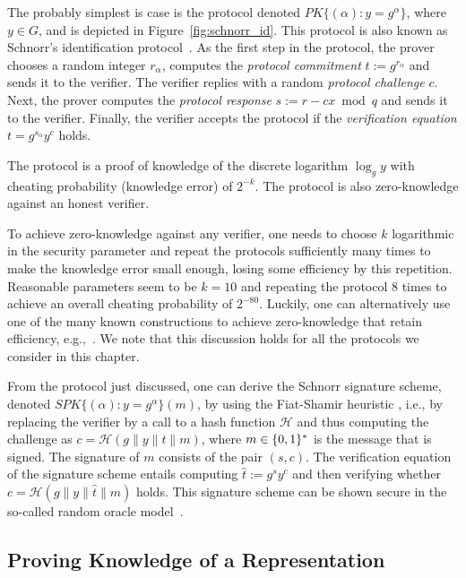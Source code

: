 The probably simplest is case is the protocol  
denoted $\textit{PK}\{(\alpha): y = g^\alpha \}$, where $y \in G$, and is depicted in Figure~\ref{fig:schnorr_id}.
This protocol is also known as Schnorr's identification protocol~\cite{schnor91}.
As the first step in the protocol,
the prover chooses a random integer $r_\alpha$, 
computes the \emph{protocol commitment}
$t:= g^{r_\alpha}$ and sends it to the verifier.
The verifier replies with a random \emph{protocol challenge}
 $c$. 
Next, the prover computes the \emph{protocol response} 
$s := r - cx \bmod{q}$ and sends it
to the verifier. 
Finally, the verifier accepts the protocol if the \emph{verification equation}
$t = g^{s_\alpha} y ^c$ holds.

The protocol is a proof of knowledge of the discrete logarithm $\log_g y$ 
with cheating probability (knowledge error) of $2^{-k}$.
The protocol is also zero-knowledge against an honest verifier.

To achieve zero-knowledge against any verifier, one  needs to choose
$k$ logarithmic in the security parameter and repeat the protocols sufficiently 
many times to make the knowledge error small enough, losing some efficiency
by this repetition.
Reasonable parameters seem to be $k=10$ and repeating the protocol $8$ times to achieve an
overall cheating probability of $2^{-80}$.
Luckily, one can alternatively use one of the many known constructions to achieve zero-knowledge
that retain efficiency, e.g.,~\cite{damgar00}.
We note that this discussion holds for all the protocols we consider in this chapter.


From the protocol just discussed, one can derive the Schnorr signature scheme,
denoted  $\textit{SPK}\{(\alpha): y = g^\alpha \}(m)$, by
using the Fiat-Shamir heuristic \cite{fiasha86,poiste96a}, i.e., by
replacing the verifier by a call to a hash function $\mathcal{H}$ and 
thus computing the challenge as $c = \mathcal{H}(g\|y\|t\|m)$,
where $m \in \{0,1\}^*$ is the message that is signed.
The signature of $m$ consists of the pair $(s,c)$.
The verification equation of the signature scheme entails
computing $\hat{t} := g^s y^{c}$ and then verifying 
whether $c = \mathcal{H}(g\|y\|\hat{t}\|m)$ holds.
This signature scheme can be shown secure in the so-called random oracle 
model~\cite{belrog93}. 



\subsection{Proving Knowledge of a Representation}
\label{Proving Knowledge of a Representation}

